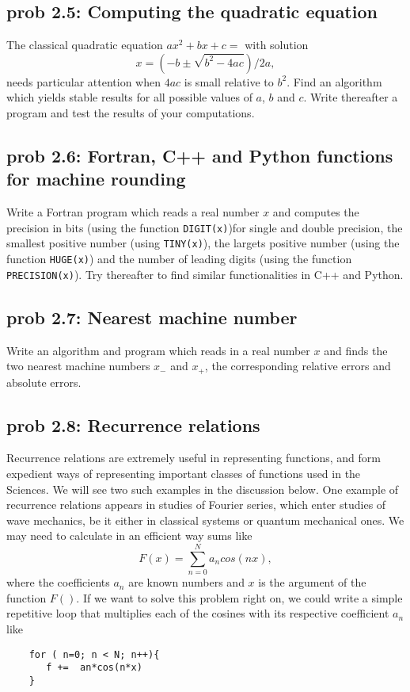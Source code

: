 \subsection*{prob 2.5: Computing the quadratic equation}
The classical quadratic equation $ax^2+bx+c=$ with solution
\[
      x = \left(-b\pm \sqrt{b^2-4ac}\right)/2a,
\]
needs particular attention when $4ac$ is small relative to $b^2$. Find an algorithm which 
yields stable results for all possible values of $a$, $b$ and $c$. Write thereafter a program and 
test the results of your computations.




\subsection*{prob 2.6: Fortran, C++ and Python functions for machine rounding}
Write a Fortran program which reads a real number $x$ and computes the precision in bits (using the function
\lstinline{DIGIT(x)})for single and double precision, the smallest positive number
(using \lstinline{TINY(x)}), the largets positive number (using the function \lstinline{HUGE(x)})
and the number of leading digits (using the function \lstinline{PRECISION(x)}).  
Try thereafter to find similar functionalities in C++ and Python.



\subsection*{prob 2.7: Nearest machine number}
Write an algorithm and program which reads in a real number $x$ and finds the two nearest machine
numbers $x_{-}$ and $x_{+}$, the corresponding relative errors and absolute errors.  




\subsection*{prob 2.8: Recurrence relations}
Recurrence relations are
extremely useful in representing functions, and form expedient ways of
representing important classes of functions used in the Sciences. We will
see two such examples in the discussion below.
%
One example of recurrence relations appears in studies
of Fourier series, which enter studies of
wave mechanics, be it either in classical systems or quantum
mechanical ones. We may need to calculate in an efficient 
way sums like
%
\begin{equation}
   F(x)=\sum_{n=0}^{N}a_n cos(nx),
\label{four-1}
\end{equation}
%
where the coefficients $a_n$ are known numbers and $x$ is the argument of
the function $F()$. If we want to solve this problem
right on, we could write a simple repetitive loop that 
multiplies each of the cosines with its respective 
coefficient $a_n$ like
\begin{lstlisting}
    for ( n=0; n < N; n++){
       f +=  an*cos(n*x)
    }
\end{lstlisting}

